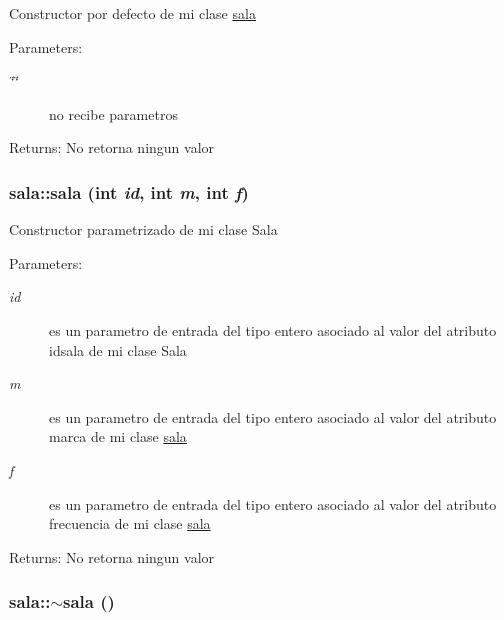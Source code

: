 Constructor por defecto de mi clase \hyperlink{classsala}{sala} \begin{Desc}
\item[Parameters:]
\begin{description}
\item[{\em \char`\"{}\char`\"{}}]no recibe parametros \end{description}
\end{Desc}
\begin{Desc}
\item[Returns:]No retorna ningun valor \end{Desc}
\hypertarget{classsala_265933f2f255cbce1f724d1c07957d69}{
\subsubsection[sala]{\setlength{\rightskip}{0pt plus 5cm}sala::sala (int {\em id}, \/  int {\em m}, \/  int {\em f})}}
\label{classsala_265933f2f255cbce1f724d1c07957d69}


Constructor parametrizado de mi clase Sala \begin{Desc}
\item[Parameters:]
\begin{description}
\item[{\em id}]es un parametro de entrada del tipo entero asociado al valor del atributo idsala de mi clase Sala \item[{\em m}]es un parametro de entrada del tipo entero asociado al valor del atributo marca de mi clase \hyperlink{classsala}{sala} \item[{\em f}]es un parametro de entrada del tipo entero asociado al valor del atributo frecuencia de mi clase \hyperlink{classsala}{sala} \end{description}
\end{Desc}
\begin{Desc}
\item[Returns:]No retorna ningun valor \end{Desc}
\hypertarget{classsala_108d16054e4c939568ab2c301a5cea83}{
\subsubsection[$\sim$sala]{\setlength{\rightskip}{0pt plus 5cm}sala::$\sim$sala ()}}
\label{classsala_108d16054e4c939568ab2c301a5cea83}


